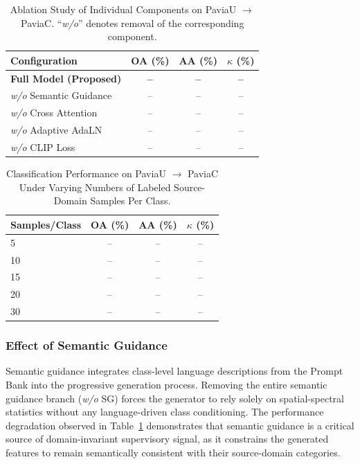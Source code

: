 \begin{table}[h]
\centering
\caption{Ablation Study of Individual Components on PaviaU $\to$ PaviaC.
``\textit{w/o}'' denotes removal of the corresponding component.}
\label{tab:ablation_components}
\begin{tabular}{lccc}
\toprule
\textbf{Configuration} & \textbf{OA (\%)} & \textbf{AA (\%)} & \textbf{$\kappa$ (\%)} \\
\midrule
\textbf{Full Model (Proposed)} & \textbf{--} & \textbf{--} & \textbf{--} \\
\textit{w/o} Semantic Guidance & -- & -- & -- \\
\textit{w/o} Cross Attention & -- & -- & -- \\
\textit{w/o} Adaptive AdaLN & -- & -- & -- \\
\textit{w/o} CLIP Loss & -- & -- & -- \\
\bottomrule
\end{tabular}
\end{table}

\begin{table}[h]
\centering
\caption{Classification Performance on PaviaU $\to$ PaviaC
Under Varying Numbers of Labeled Source-Domain Samples Per Class.}
\label{tab:ablation_samples}
\begin{tabular}{lccc}
\toprule
\textbf{Samples/Class} & \textbf{OA (\%)} & \textbf{AA (\%)} & \textbf{$\kappa$ (\%)} \\
\midrule
5  & -- & -- & -- \\
10 & -- & -- & -- \\
15 & -- & -- & -- \\
20 & -- & -- & -- \\
30 & -- & -- & -- \\
\bottomrule
\end{tabular}
\end{table}

\subsubsection{Effect of Semantic Guidance}
Semantic guidance integrates class-level language descriptions from the Prompt Bank into the progressive generation process. Removing the entire semantic guidance branch (\textit{w/o} SG) forces the generator to rely solely on spatial-spectral statistics without any language-driven class conditioning. The performance degradation observed in Table~\ref{tab:ablation_components} demonstrates that semantic guidance is a critical source of domain-invariant supervisory signal, as it constrains the generated features to remain semantically consistent with their source-domain categories.

